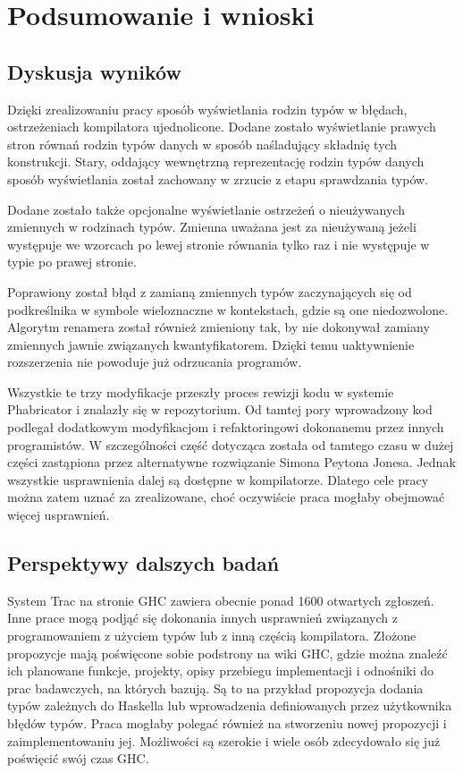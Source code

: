 \chapter{Podsumowanie i wnioski}\label{chap:podsumowanie}

\section{Dyskusja wyników}

Dzięki zrealizowaniu pracy sposób wyświetlania rodzin typów w błędach, ostrzeżeniach kompilatora ujednolicone. Dodane zostało wyświetlanie prawych stron równań rodzin typów danych w sposób naśladujący składnię tych konstrukcji. Stary, oddający wewnętrzną reprezentację rodzin typów danych sposób wyświetlania został zachowany w zrzucie z etapu sprawdzania typów. 

Dodane zostało także opcjonalne wyświetlanie ostrzeżeń o nieużywanych zmiennych w rodzinach typów. Zmienna uważana jest za nieużywaną jeżeli występuje we wzorcach po lewej stronie równania tylko raz i nie występuje w typie po prawej stronie. 

Poprawiony został błąd z zamianą zmiennych typów zaczynających się od podkreślnika w symbole wieloznaczne w kontekstach, gdzie są one niedozwolone. Algorytm renamera został również zmieniony tak, by nie dokonywał zamiany zmiennych jawnie związanych kwantyfikatorem. Dzięki temu uaktywnienie rozszerzenia  nie powoduje już odrzucania programów.

Wszystkie te trzy modyfikacje przeszły proces rewizji kodu w systemie Phabricator i znalazły się w repozytorium. Od tamtej pory wprowadzony kod podlegał dodatkowym modyfikacjom i refaktoringowi dokonanemu przez innych programistów. W szczególności część dotycząca  została od tamtego czasu w dużej części zastąpiona przez alternatywne rozwiązanie Simona Peytona Jonesa. Jednak wszystkie usprawnienia dalej są dostępne w kompilatorze. Dlatego cele pracy można zatem uznać za zrealizowane, choć oczywiście praca mogłaby obejmować więcej usprawnień. 

\section{Perspektywy dalszych badań}
System Trac na stronie GHC zawiera obecnie ponad 1600 otwartych zgłoszeń\cite{WikiTickets}. Inne prace mogą podjąć się dokonania innych usprawnień związanych z programowaniem z użyciem typów lub z inną częścią kompilatora. Złożone propozycje mają poświęcone sobie podstrony na wiki GHC, gdzie można znaleźć ich planowane funkcje, projekty, opisy przebiegu implementacji i odnośniki do prac badawczych, na których bazują. Są to na przykład propozycja dodania typów zależnych do Haskella lub wprowadzenia definiowanych przez użytkownika błędów typów. Praca mogłaby polegać również na stworzeniu nowej propozycji i zaimplementowaniu jej. Możliwości są szerokie i wiele osób zdecydowało się już poświęcić swój czas GHC.

